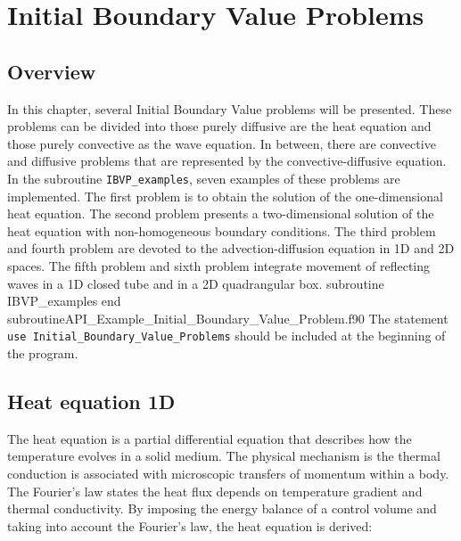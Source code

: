      
 \chapter{Initial Boundary Value Problems   }\label{user:IVBP}
\vspace{-1cm}
\section{Overview}
\vspace{-0.2cm} 
In this chapter, several Initial  Boundary Value problems will be presented. 
These problems can be divided into those purely diffusive are the heat equation and those purely convective as the wave equation. 
In between,  there are convective and diffusive problems that are represented by the convective-diffusive equation.
In the subroutine \verb|IBVP_examples|,  seven examples of these problems are implemented.
The first problem is to obtain the solution of the one-dimensional heat equation. The second problem presents a two-dimensional solution of the heat equation with non-homogeneous boundary conditions. 
The third problem and fourth problem are devoted to the advection-diffusion equation in 1D and 2D spaces. 
The fifth problem and sixth problem integrate movement of reflecting waves in a 1D closed tube and   in a 2D quadrangular box. 
\vspace{0.2cm} 
         {subroutine IBVP_examples}
         {end subroutine}{API_Example_Initial_Boundary_Value_Problem.f90}
\vspace{-0.2cm}
The statement
\verb|use Initial_Boundary_Value_Problems| should be included at the beginning of the program.


      
\section{Heat equation 1D}
The heat equation is a partial differential equation that describes how the temperature evolves in a solid medium. 
The physical mechanism is the thermal conduction is associated with microscopic transfers of momentum within a body. The Fourier's law states the heat flux depends on temperature gradient and thermal conductivity. By imposing the energy balance of a control volume and taking into account the Fourier's law, the heat equation is derived: 
   
